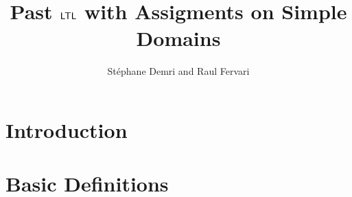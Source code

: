 \documentclass{article}
\title{Past $\textsf{LTL}$ with Assigments on Simple Domains}
\author{St\'ephane Demri and Raul Fervari}
\date{ }
\begin{document}
\maketitle 



\section{Introduction}

\section{Basic Definitions}





\end{document}
